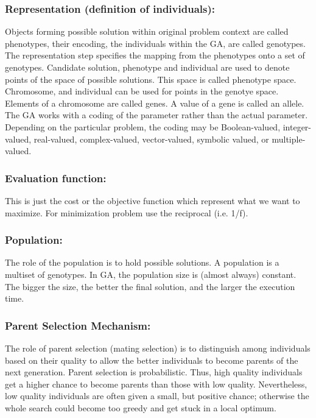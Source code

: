 \subsubsection*{Representation (definition of individuals):}
Objects forming possible solution within original problem context are called phenotypes, their encoding, the individuals within the GA, are called genotypes.
The representation step specifies the mapping from the phenotypes onto a set of genotypes.
Candidate solution, phenotype and individual are used to denote points of the space of possible solutions. This space is called phenotype space.
Chromosome, and individual can be used for points in the genotye space.
Elements of a chromosome are called genes. A value of a gene is called an allele.
The GA works with a coding of the parameter rather than the actual parameter. Depending  on the particular  problem,  the  coding  may  be  Boolean-valued,  integer-valued,  real-valued,   complex-valued, vector-valued,  symbolic  valued,  or multiple-valued.

\subsubsection*{Evaluation function:}
This is just the cost or the objective function which represent what we want to maximize. For minimization problem use the reciprocal (i.e. 1/f).

\subsubsection*{Population:}
The role of the population is to hold possible solutions. A population is a multiset of genotypes. In GA, the population size is (almost always) constant. The bigger the size, the better the final solution, and the larger the execution time.

\subsubsection*{Parent Selection Mechanism:}
The role of parent selection (mating selection) is to distinguish among individuals based on their quality to allow the better individuals to become parents of the next generation.
Parent selection is probabilistic. Thus, high quality individuals get a higher chance to become parents than those with low quality. Nevertheless, low quality individuals are often given a small, but positive chance; otherwise the whole search could become too greedy and get stuck in a local optimum.

